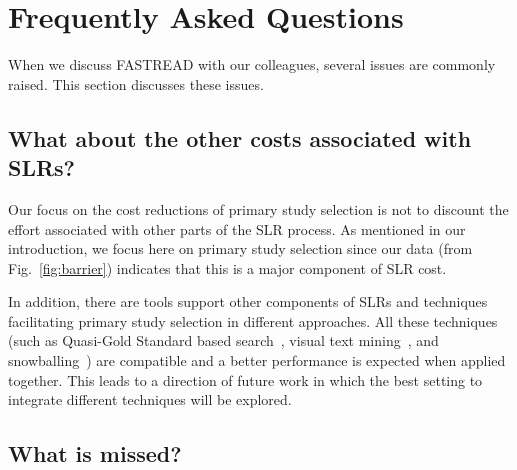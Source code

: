 \documentclass{svjour3}
\theoremstyle{break}
\begin{document}
\section{Frequently Asked Questions}
\label{sect: Frequently Asked Questions}

When we discuss FASTREAD with our colleagues, several issues are commonly raised. This section discusses these issues.

\subsection{What about the other costs associated with SLRs?}

Our focus on the cost reductions of primary study selection is not to discount the effort associated with other parts of the SLR process. As mentioned in our introduction, we focus here on primary study selection since our data (from Fig.~\ref{fig:barrier}) indicates that this is a major component of SLR cost. 

In addition, there are tools support other components of SLRs and techniques facilitating primary study selection in different approaches. All these techniques (such as Quasi-Gold Standard based search~\cite{zhang2011empirical,zhang2011identifying}, visual text mining~\cite{Felizardo:2014:VAA:2601248.2601252,felizardo2012visual,felizardo2010approach,malheiros2007visual}, and snowballing~\cite{wohlin2014guidelines,jalali2012systematic}) are compatible and a better performance is expected when applied together. This leads to a direction of future work in which the best setting to integrate different techniques will be explored.

\subsection{What is missed?}
\end{document}
